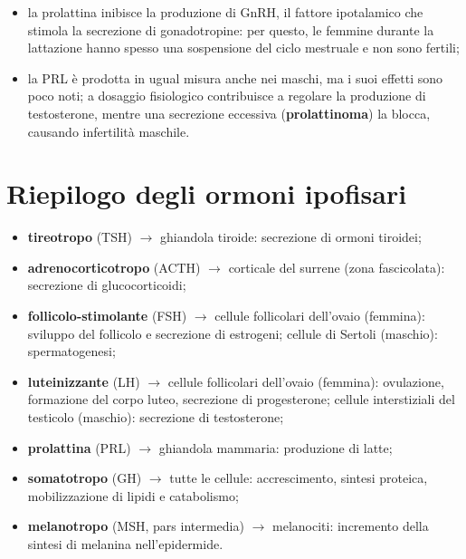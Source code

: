 \begin{itemize}
  \item la prolattina inibisce la produzione di GnRH, il fattore
    ipotalamico che stimola la secrezione di gonadotropine: per questo, le
    femmine durante la lattazione hanno spesso una sospensione del ciclo
    mestruale e non sono fertili;
  \item la PRL è prodotta in ugual misura anche nei maschi, ma i suoi
    effetti sono poco noti; a dosaggio fisiologico contribuisce a regolare
    la produzione di testosterone, mentre una secrezione eccessiva
    (\textbf{prolattinoma}) la blocca, causando infertilità maschile.
\end{itemize}

\section{Riepilogo degli ormoni ipofisari}

\begin{itemize}
  \item \textbf{tireotropo} (TSH) $\rightarrow$ ghiandola tiroide:
    secrezione di ormoni tiroidei;
  \item \textbf{adrenocorticotropo} (ACTH) $\rightarrow$ corticale del
    surrene (zona fascicolata): secrezione di glucocorticoidi;
  \item \textbf{follicolo-stimolante} (FSH) $\rightarrow$ cellule
    follicolari dell'ovaio (femmina): sviluppo del follicolo e secrezione
    di estrogeni; cellule di Sertoli (maschio): spermatogenesi;
  \item \textbf{luteinizzante} (LH) $\rightarrow$ cellule follicolari
    dell'ovaio (femmina): ovulazione, formazione del corpo luteo,
    secrezione di progesterone; cellule interstiziali del testicolo
    (maschio): secrezione di testosterone;
  \item \textbf{prolattina} (PRL) $\rightarrow$ ghiandola mammaria:
    produzione di latte;
  \item \textbf{somatotropo} (GH) $\rightarrow$ tutte le cellule:
    accrescimento, sintesi proteica, mobilizzazione di lipidi e catabolismo;
  \item \textbf{melanotropo} (MSH, pars intermedia) $\rightarrow$
    melanociti: incremento della sintesi di melanina nell'epidermide.
\end{itemize}


